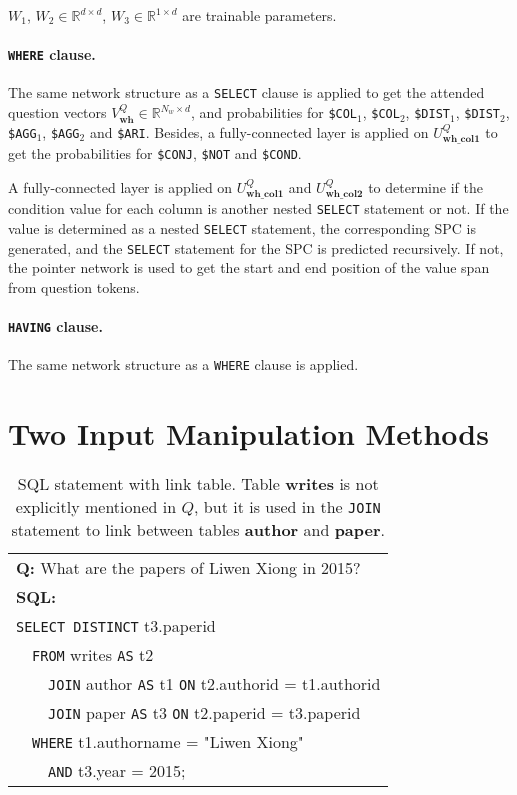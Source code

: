 \documentclass[11pt,a4paper]{article}
\begin{document}
$W_1$, $W_2 \in \mathbb{R}^{d \times d}$, $W_3 \in \mathbb{R}^{1 \times d}$ are trainable parameters.

\paragraph{\texttt{WHERE} clause.} The same network structure as a \texttt{SELECT} clause is applied to get the attended question vectors $V^Q_\textbf{wh} \in \mathbb{R}^{N_w \times d}$, and probabilities for \texttt{\$COL$_1$}, \texttt{\$COL$_2$}, \texttt{\$DIST$_1$}, \texttt{\$DIST$_2$}, \texttt{\$AGG$_1$}, \texttt{\$AGG$_2$} and \texttt{\$ARI}. Besides, a fully-connected layer is applied on $U^Q_\textbf{wh\_col1}$ to get the probabilities for \texttt{\$CONJ}, \texttt{\$NOT} and \texttt{\$COND}.

 A fully-connected layer is applied on $U^Q_\textbf{wh\_col1}$ and $U^Q_\textbf{wh\_col2}$ to determine if the condition value for each column is another nested \texttt{SELECT} statement or not. If the value is determined as a nested \texttt{SELECT} statement, the corresponding SPC is generated, and the \texttt{SELECT} statement for the SPC is predicted recursively. If not, the pointer network is used to get the start and end position of the value span from question tokens. 


\paragraph{\texttt{HAVING} clause.} The same network structure as a \texttt{WHERE} clause is applied.


\section{Two Input Manipulation Methods}
\label{sec:data}

\begin{table}
\centering
\begin{tabular}{|l|} \hline
\textbf{Q:} What are the papers of Liwen Xiong in 2015? \\
\textbf{SQL:} \\
\texttt{SELECT DISTINCT} t3.paperid \\
~~\texttt{FROM} writes \texttt{AS} t2 \\
~~~~\texttt{JOIN} author \texttt{AS} t1 \texttt{ON} t2.authorid  =  t1.authorid \\
~~~~\texttt{JOIN} paper \texttt{AS} t3 \texttt{ON} t2.paperid  =  t3.paperid  \\
~~\texttt{WHERE} t1.authorname  =  "Liwen Xiong"  \\
~~~~\texttt{AND} t3.year  =  2015; \\ \hline
\end{tabular}
\caption{SQL statement with link table. Table \textbf{writes} is not explicitly mentioned in $Q$, but it is used in the \texttt{JOIN} statement to link between tables \textbf{author} and \textbf{paper}.}
\label{tbl:linktbl}
\end{table}
\end{document}
